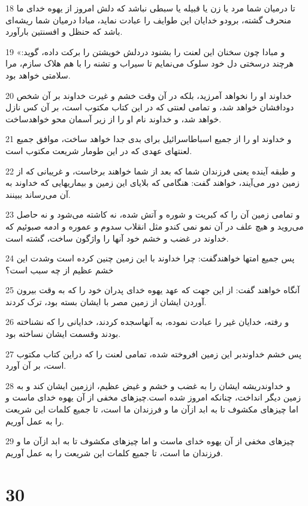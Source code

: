 \par 18 تا درمیان شما مرد یا زن یا قبیله یا سبطی نباشد که دلش امروز از یهوه خدای ما منحرف گشته، برودو خدایان این طوایف را عبادت نماید، مبادا درمیان شما ریشه‌ای باشد که حنظل و افسنتین بارآورد.
\par 19 «و مبادا چون سخنان این لعنت را بشنود دردلش خویشتن را برکت داده، گوید: هر‌چند درسختی دل خود سلوک می‌نمایم تا سیراب و تشنه را با هم هلاک سازم، مرا سلامتی خواهد بود.
\par 20 خداوند او را نخواهد آمرزید، بلکه در آن وقت خشم و غیرت خداوند بر آن شخص دودافشان خواهد شد، و تمامی لعنتی که در این کتاب مکتوب است، بر آن کس نازل خواهد شد، و خداوند نام او را از زیر آسمان محو خواهدساخت.
\par 21 و خداوند او را از جمیع اسباطاسرائیل برای بدی جدا خواهد ساخت، موافق جمیع لعنتهای عهدی که در این طومار شریعت مکتوب است.
\par 22 و طبقه آینده یعنی فرزندان شما که بعد از شما خواهند برخاست، و غریبانی که از زمین دور می‌آیند، خواهند گفت: هنگامی که بلایای این زمین و بیماریهایی که خداوند به آن می‌رساند ببینند.
\par 23 و تمامی زمین آن را که کبریت و شوره و آتش شده، نه کاشته می‌شود و نه حاصل می‌روید و هیچ علف در آن نمو نمی کندو مثل انقلاب سدوم و عموره و ادمه صبوئیم که خداوند در غضب و خشم خود آنها را واژگون ساخت، گشته است.
\par 24 پس جمیع امتها خواهندگفت: چرا خداوند با این زمین چنین کرده است وشدت این خشم عظیم از چه سبب است؟
\par 25 آنگاه خواهند گفت: از این جهت که عهد یهوه خدای پدران خود را که به وقت بیرون آوردن ایشان از زمین مصر با ایشان بسته بود، ترک کردند.
\par 26 و رفته، خدایان غیر را عبادت نموده، به آنهاسجده کردند، خدایانی را که نشناخته بودند وقسمت ایشان نساخته بود.
\par 27 پس خشم خداوندبر این زمین افروخته شده، تمامی لعنت را که دراین کتاب مکتوب است، بر آن آورد.
\par 28 و خداوندریشه ایشان را به غضب و خشم و غیض عظیم، اززمین ایشان کند و به زمین دیگر انداخت، چنانکه امروز شده است.چیزهای مخفی از آن یهوه خدای ماست و اما چیزهای مکشوف تا به ابد ازآن ما و فرزندان ما است، تا جمیع کلمات این شریعت را به عمل آوریم.
\par 29 چیزهای مخفی از آن یهوه خدای ماست و اما چیزهای مکشوف تا به ابد ازآن ما و فرزندان ما است، تا جمیع کلمات این شریعت را به عمل آوریم.
 
\chapter{30}

